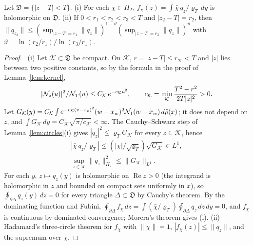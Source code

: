 \begin{lemma}\label{lem:holo}
Let $\mathfrak D=\{|z-T|<T\}$.
(i) For each $\chi\in H_T$, $f_\chi(z)=\int\bar\chi\,q_z/\varrho_T\,dy$ is holomorphic on $\mathfrak D$.
(ii) If $0<r_1<r_2<r_3<T$ and $|z_2-T|=r_2$, then $\|q_{z_2}\|\le(\sup_{|z-T|=r_1}\|q_z\|)^{1-\vartheta}(\sup_{|z-T|=r_3}\|q_z\|)^{\vartheta}$ with $\vartheta=\ln(r_2/r_1)/\ln(r_3/r_1)$.
\end{lemma}
\begin{proof}\proofst\
(i) Let $\mathcal K\subset\mathfrak D$ be compact.
On $\mathcal K$, $r=|z-T|\le r_{\mathcal K}<T$ and $|z|$ lies between two positive constants, so by the formula in the proof of Lemma~\ref{lem:kernel},
\[
|\mathcal N_z(u)|^2/\mathcal N_T(u)\le C_{\mathcal K}\,e^{-c_{\mathcal K}u^2},\qquad c_{\mathcal K}=\min_{\mathcal K}\frac{T^2-r^2}{2T|z|^2}>0 .
\]
Let $G_{\mathcal K}(y)=C_{\mathcal K}\int e^{-c_{\mathcal K}(v-x_v)^2}(w-x_w)^2\mathcal N_1(w-x_w)\,d\tilde\rho(x)$; it does not depend on $z$, and $\int G_{\mathcal K}\,dy=C_{\mathcal K}\sqrt{\pi/c_{\mathcal K}}<\infty$.
The Cauchy--Schwarz step of Lemma~\ref{lem:circles}(i) gives $|q_z|^2\le\varrho_TG_{\mathcal K}$ for every $z\in\mathcal K$, hence
\[
\begin{gathered}
|\bar\chi\,q_z/\varrho_T|\le(|\chi|/\sqrt{\varrho_T})\sqrt{G_{\mathcal K}}\in L^1,\\ \sup_{z\in\mathcal K}\|q_z\|_{H_T}^2\le\|G_{\mathcal K}\|_{L^1}.
\end{gathered}
\]
For each $y$, $z\mapsto q_z(y)$ is holomorphic on $\operatorname{Re}z>0$ (the integrand is holomorphic in $z$ and bounded on compact sets uniformly in $x$), so $\oint_{\partial\Delta}q_z(y)\,dz=0$ for every triangle $\Delta\subset\mathfrak D$ by Cauchy's theorem.
By the dominating function and Fubini, $\oint_{\partial\Delta}f_\chi\,dz=\int(\bar\chi/\varrho_T)\oint_{\partial\Delta}q_z\,dz\,dy=0$, and $f_\chi$ is continuous by dominated convergence; Morera's theorem gives (i).
(ii) Hadamard's three-circle theorem for $f_\chi$ with $\|\chi\|=1$, $|f_\chi(z)|\le\|q_z\|$, and the supremum over $\chi$.
\end{proof}

